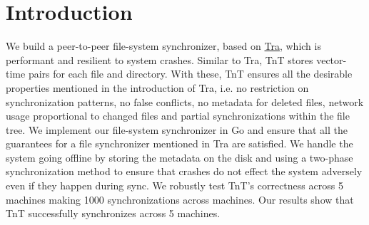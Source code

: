 \section {Introduction}
We build a peer-to-peer file-system synchronizer, based on \href{http://swtch.com/tra/}{Tra}, which is performant and resilient to system crashes. Similar to Tra, TnT stores vector-time pairs for each file and directory.  With these, TnT ensures all the desirable properties mentioned in the introduction of Tra, i.e. no restriction on synchronization patterns, no false conflicts, no metadata for deleted files, network usage proportional to changed files and partial synchronizations within the file tree. We implement our file-system synchronizer in Go and ensure that all the guarantees for a file synchronizer mentioned in Tra are satisfied. We handle the system going offline by storing the metadata on the disk and using a two-phase synchronization method to ensure that crashes do not effect the system adversely even if they happen during sync.  We robustly test TnT's correctness across 5 machines making 1000 synchronizations across machines. Our results show that TnT successfully synchronizes across 5 machines.
